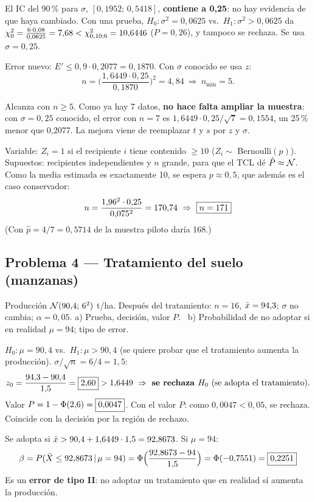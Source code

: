  El IC del 90\,\% para $\sigma$, $[0{,}1952;\,0{,}5418]$, \textbf{contiene a 0,25}: no hay evidencia de que haya cambiado. Con una prueba, $H_0:\sigma^2=0{,}0625$ vs.\ $H_1:\sigma^2>0{,}0625$ da $\chi^2_0=\frac{6\cdot0{,}08}{0{,}0625}=7{,}68<\chi^2_{0,10;6}=10{,}6446$ ($P=0{,}26$), y tampoco se rechaza. Se usa $\sigma=0{,}25$.

 Error nuevo: $E'\le0{,}9\cdot0{,}2077=0{,}1870$. Con $\sigma$ conocido se usa $z$:
\[
n=\Big(\frac{1{,}6449\cdot0{,}25}{0{,}1870}\Big)^2=4{,}84\ \Rightarrow\ n_{\min}=5.
\]
\begin{resp}
Alcanza con $n\ge5$. Como ya hay 7 datos, \textbf{no hace falta ampliar la muestra}: con $\sigma=0{,}25$ conocido, el error con $n=7$ es $1{,}6449\cdot0{,}25/\sqrt7=0{,}1554$, un 25\,\% menor que 0,2077. La mejora viene de reemplazar $t$ y $s$ por $z$ y $\sigma$.
\end{resp}

Variable: $Z_i=1$ si el recipiente $i$ tiene contenido $\ge10$ ($Z_i\sim$ Bernoulli$(p)$). Supuestos: recipientes independientes y $n$ grande, para que el TCL dé $\hat P\approx\mathcal{N}$.
Como la media estimada es exactamente 10, se espera $p\approx0{,}5$, que además es el caso conservador:
\[
n=\frac{1{,}96^2\cdot0{,}25}{0{,}075^2}=170{,}74\ \Rightarrow\ \res{n=171}
\]
(Con $\hat p=4/7=0{,}5714$ de la muestra piloto daría 168.)

\subsection{Problema 4 --- Tratamiento del suelo (manzanas)}
\begin{enun}
Producción $\mathcal{N}(90{,}4;\,6^2)$ t/ha. Después del tratamiento: $n=16$, $\bar{x}=94{,}3$; $\sigma$ no cambia; $\alpha=0{,}05$. a) Prueba, decisión, valor $P$. \ b) Probabilidad de no adoptar si en realidad $\mu=94$; tipo de error.
\end{enun}
$H_0:\mu=90{,}4$ vs.\ $H_1:\mu>90{,}4$ (se quiere probar que el tratamiento aumenta la producción). $\sigma/\sqrt n=6/4=1{,}5$:
\[
z_0=\frac{94{,}3-90{,}4}{1{,}5}=\res{2{,}60}>1{,}6449\ \Rightarrow\ \textbf{se rechaza }H_0\ \text{(se adopta el tratamiento)}.
\]
Valor $P=1-\Phi(2{,}6)=\boxed{0{,}0047}$.
Con el valor $P$: como $0{,}0047<0{,}05$, se rechaza. Coincide con la decisión por la región de rechazo.

Se adopta si $\bar{x}>90{,}4+1{,}6449\cdot1{,}5=92{,}8673$. Si $\mu=94$:
\[
\beta=P(\bar{X}\le92{,}8673\,|\,\mu=94)=\Phi\Big(\frac{92{,}8673-94}{1{,}5}\Big)=\Phi(-0{,}7551)=\boxed{0{,}2251}
\]
Es un \textbf{error de tipo II}: no adoptar un tratamiento que en realidad sí aumenta la producción.
